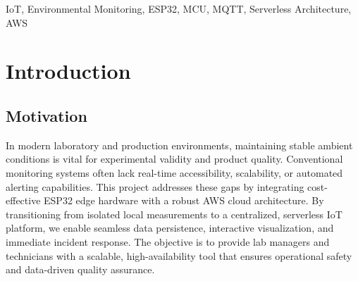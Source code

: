 \documentclass[conference,a4paper,flushend]{cs-techrep} %
\begin{document}
\selectlanguage{\cstechrepLang}
\maketitle
\begin{abstract}
    Background: Reliable environmental monitoring is essential for laboratory and facility safety,
    yet many systems trade off scalability, security, or real-time access. Objective: This concept
    paper proposes Sensiq, an MCU-based IoT architecture intended to enable secure, low-latency
    live monitoring and scalable historical storage for environmental sensor data.

    Methods: We describe a serverless AWS-based pipeline in which ESP32 edge devices publish
    JSON-encoded measurements (temperature, humidity, gas, flame) over MQTT/TLS. The architecture
    specifies Lambda-based validation and persistence to DynamoDB and S3, and REST endpoints for
    `GET /live` and `GET /history`. We propose a configurable simulator to exercise ingestion and
    retrieval without physical hardware and to guide future implementation and testing.

    Conclusion: Sensiq defines a lightweight, extensible foundation for laboratory environmental
    monitoring. Future work focuses on implementing the MVP, adding a web dashboard 
    and notification services for visualization and alerts.
\end{abstract}
\begin{IEEEkeywords}
    IoT, Environmental Monitoring, ESP32, MCU, MQTT, Serverless Architecture, AWS
\end{IEEEkeywords}

\section{Introduction}\label{sec:introduction}

\subsection{Motivation}\label{sec:motivation}
In modern laboratory and production environments, maintaining stable ambient conditions is vital for experimental validity and product 
quality. Conventional monitoring systems often lack real-time accessibility, scalability, or automated alerting capabilities.
This project addresses these gaps by integrating cost-effective ESP32 edge hardware with a robust AWS cloud architecture.
By transitioning from isolated local measurements to a centralized, serverless IoT platform, we enable seamless data persistence,
interactive visualization, and immediate incident response. The objective is to provide lab managers and technicians with a scalable,
high-availability tool that ensures operational safety and data-driven quality assurance.
\end{document}
